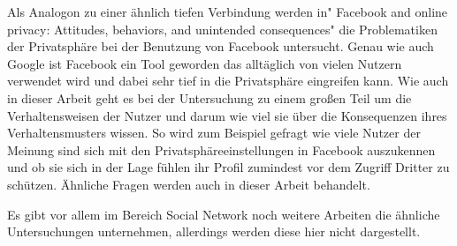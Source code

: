Als Analogon zu einer ähnlich tiefen Verbindung werden in" Facebook and online privacy: Attitudes, behaviors, and unintended consequences" \cite{debatin2009facebook} die Problematiken der Privatsphäre bei der Benutzung von Facebook untersucht. Genau wie auch Google ist Facebook ein Tool geworden das alltäglich von vielen Nutzern verwendet wird und dabei sehr tief in die Privatsphäre eingreifen kann. Wie auch in dieser Arbeit geht es bei der Untersuchung zu einem großen Teil um die Verhaltensweisen der Nutzer und darum wie viel sie über die Konsequenzen ihres Verhaltensmusters wissen. So wird zum Beispiel gefragt wie viele Nutzer der Meinung sind sich mit den Privatsphäreeinstellungen in Facebook auszukennen und ob sie sich in der Lage fühlen ihr Profil zumindest vor dem Zugriff Dritter zu schützen. Ähnliche Fragen werden auch in dieser Arbeit behandelt.

Es gibt vor allem im Bereich Social Network noch weitere Arbeiten die ähnliche Untersuchungen unternehmen, allerdings werden diese hier nicht dargestellt.